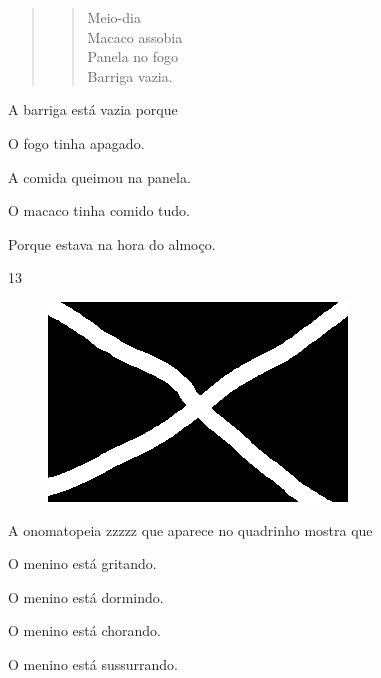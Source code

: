 \begin{quote}
\begin{verse}
Meio-dia\\
Macaco assobia\\
Panela no fogo\\
Barriga vazia.
\end{verse}

\end{quote}

A barriga está vazia porque

\begin{escolha}
\item O fogo tinha apagado.

\item A comida queimou na panela.

\item O macaco tinha comido tudo.

\item Porque estava na hora do almoço.
\end{escolha}


\num{13}

\begin{figure}[htpb!]
\centering
\includegraphics[width=.5\textwidth]{media/confederados.png}
\end{figure}

\pagebreak

A onomatopeia zzzzz que aparece no quadrinho mostra que

\begin{escolha}
\item O menino está gritando.

\item O menino está dormindo.

\item O menino está chorando.

\item O menino está sussurrando.
\end{escolha}

